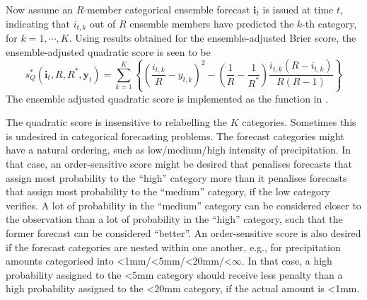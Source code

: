 \documentclass[article]{jss}\usepackage{graphicx, color}
\begin{document}
Now assume an $R$-member categorical ensemble forecast $\mathbf{i}_t$ is issued at time $t$, indicating that $i_{t,k}$ out of $R$ ensemble members have predicted the $k$-th category, for $k=1,\cdots,K$.
Using results obtained for the ensemble-adjusted Brier score, the ensemble-adjusted quadratic score is seen to be
%
\begin{equation}
s_{Q}^*(\mathbf{i}_t, R, R^*, \mathbf{y}_t) = \sum_{k=1}^K \left\{ \left(\frac{i_{t,k}}{R} - y_{t,k}\right)^2 - \left(\frac{1}{R} - \frac{1}{R^*}\right) \frac{i_{t,k}(R-i_{t,k})}{R(R-1)}\right\}
\end{equation}
%
The ensemble adjusted quadratic score is implemented as the function  in .


The quadratic score is insensitive to relabelling the $K$ categories.
Sometimes this is undesired in categorical forecasting problems. 
The forecast categories might have a natural ordering, such as low/medium/high intensity of precipitation.
In that case, an order-sensitive score might be desired that penalises forecasts that assign most probability to the ``high'' category more than it penalises forecasts that assign most probability to the ``medium'' category, if the low category verifies. 
A lot of probability in the ``medium'' category can be considered closer to the observation than a lot of probability in the ``high'' category, such that the former forecast can be considered ``better''.
An order-sensitive score is also desired if the forecast categories are nested within one another, e.g., for precipitation amounts categorised into <1mm/<5mm/<20mm/<$\infty$.
In that case, a high probability assigned to the <5mm category should receive less penalty than a high probability assigned to the <20mm category, if the actual amount is <1mm.
\end{document}
